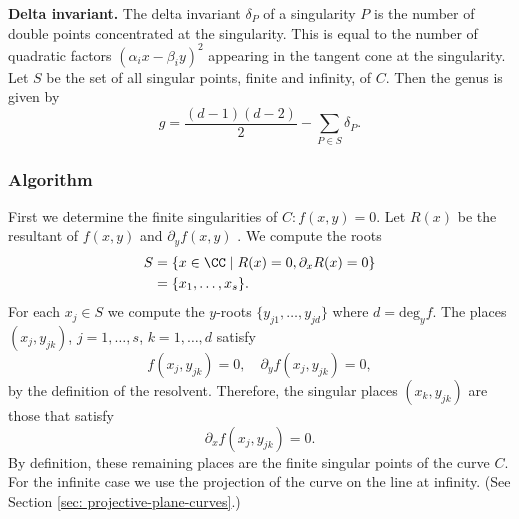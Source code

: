 {\bf Delta invariant.} The delta invariant $\delta_P$ of a singularity
$P$ is the number of double points concentrated at the singularity. This
is equal to the number of quadratic factors $(\alpha_i x - \beta_i y)^2$
appearing in the tangent cone at the singularity. Let $S$ be the set of
all singular points, finite and infinity, of $C$. Then the genus is
given by
\begin{equation} \label{eqn: genus-formula}
    g = \frac{(d-1)(d-2)}{2} - \sum_{P \in S} \delta_P.
\end{equation}


%
\subsubsection*{Algorithm}
%

First we determine the finite singularities of $C : f(x,y) = 0$. Let
$R(x)$ be the resultant of $f(x,y)$ and $\partial_y f(x,y)$
\cite{Griffiths89}. We compute the roots
\begin{align*}
    S &= \{ x \in \CC \; | \; R(x) = 0, \partial_x R(x) = 0 \} \\
      &= \{ x_1, \ldots, x_s \}.
\end{align*}
For each $x_j \in S$ we compute the $y$-roots $\{y_{j1},\ldots,y_{jd}\}$
where $d = \text{deg}_y f$. The places $(x_j,y_{jk})$, $j=1,\ldots,s$,
$k=1,\ldots,d$ satisfy
\[
    f(x_j,y_{jk}) = 0, \quad \partial_y f(x_j,y_{jk}) = 0,
\]
by the definition of the resolvent. Therefore, the singular places
$(x_k,y_{jk})$ are those that satisfy
\[
    \partial_x f(x_j,y_{jk}) = 0.
\]
By definition, these remaining places are the finite singular points of
the curve $C$. For the infinite case we use the projection of the curve
on the line at infinity. (See Section \ref{sec:
  projective-plane-curves}.)



